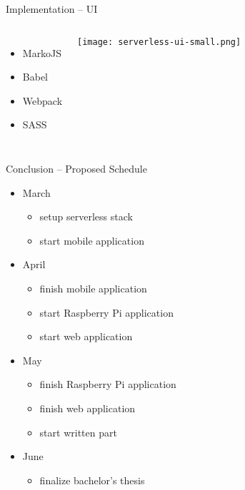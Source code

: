\documentclass[aspectratio=169]{beamer}
\begin{document}
  

  \begin{frame}{Implementation -- UI}
    \begin{columns}
        \begin{itemize}
          \item MarkoJS
          \item Babel
          \item Webpack
          \item SASS
        \end{itemize}
        \vfill
        \centering
        \texttt{[image: serverless-ui-small.png]}
     \end{columns}
  \end{frame}

  \begin{frame}{Conclusion -- Proposed Schedule}
    \begin{itemize}
      \item March
        \begin{itemize}
          \item setup serverless stack
          \item start mobile application
        \end{itemize}
      \item April
        \begin{itemize}
          \item finish mobile application
          \item start Raspberry Pi application
          \item start web application
        \end{itemize}
      \item May
        \begin{itemize}
          \item finish Raspberry Pi application
          \item finish web application
          \item start written part
        \end{itemize}
      \item June
        \begin{itemize}
          \item finalize bachelor’s thesis
        \end{itemize}
    \end{itemize}
  \end{frame}
\end{document}
